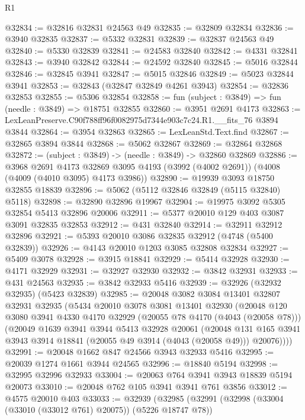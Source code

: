 \begin{lexlean}{R1}
\begin{coremodule}
@32834 := @32816 @32831 @24563 @49
@32835 := @32809 @32834
@32836 := @3940 @32835
@32837 := @5332 @32831
@32839 := @32837 @24563 @49
@32840 := @5330 @32839
@32841 := @24583 @32840
@32842 := @4331 @32841
@32843 := @3940 @32842
@32844 := @24592 @32840
@32845 := @5016 @32844
@32846 := @32845 @3941
@32847 := @5015 @32846
@32849 := @5023 @32844 @3941
@32853 := @32843 (@32847 @32849 @4261 @3943)
@32854 := @32836 @32853
@32855 := @5306 @32854
@32858 := fun (subject : @3849) => fun (needle : @3849) => @18751 @32855
@32860 := @3951 @2691 @4173
@32863 := LexLeanPreserve.C90f788ff96f0082975d7344e903c7c24.R1.__fits_76 @3894 @3844
@32864 := @3954 @32863
@32865 := LexLeanStd.Text.find
@32867 := @32865 @3894 @3844
@32868 := @5062 @32867
@32869 := @32864 @32868
@32872 := (subject : @3849) -> (needle : @3849) -> @32860 @32869
@32886 := @3968
    @2691
    @4173
    @32869
    @3095
    @4193
    (@3992 (@4002 @2691))
    (@4008 (@4009 (@4010 @3095) @4173 @3986))
@32890 := @19939 @3093 @18750 @32855 @18839
@32896 := @5062 (@5112 @32846 @32849 (@5115 @32840) @5118)
@32898 := @32890 @32896 @19967
@32904 := @19975 @3092 @5305 @32854 @5413 @32896 @20006
@32911 := @5377 @20010 @129 @403 @3087 @3091 @32835 @32853
@32912 := @431 @32840
@32914 := @32911 @32912 @32896
@32921 := @5393 @20010 @3086 @32835 @32912 (@4748 (@5400 @32839))
@32926 := @4143 @20010 @1203 @3085 @32808 @32834
@32927 := @5409 @3078
@32928 := @3915 @18841
@32929 := @5414 @32928
@32930 := @4171 @32929
@32931 := @32927 @32930
@32932 := @3842 @32931
@32933 := @431 @24563
@32935 := @3842 @32933 @5416
@32939 := @32926 (@32932 @32935) (@5423 @32839)
@32985 := @20048
    @3082
    @3084
    @13401
    @32807
    @32931
    @32935
    (@5434
      @20010
      @3078
      @3081
      @13401
      @32930
      (@20048
        @120
        @3080
        @3941
        @4330
        @4170
        @32929
        (@20055 @78 @4170 (@4043 (@20058 @78)))
        (@20049
          @1639
          @3941
          @3944
          @5413
          @32928
          @20061
          (@20048
            @131
            @165
            @3941
            @3943
            @3914
            @18841
            (@20055 @49 @3914 (@4043 (@20058 @49)))
            @20076))))
@32991 := @20048 @1662 @847 @24566 @3943 @32933 @5416
@32995 := @20039 @1274 @1661 @3944 @24565
@32996 := @18840 @5194
@32998 := @32995 @32996 @32933
@33004 := @20063 @764 @3941 @3943 @18839 @5194 @20073
@33010 := @20048 @762 @105 @3941 @3941 @761 @3856
@33012 := @4575 @20010 @403
@33033 := @32939
    (@32985
      (@32991
        (@32998 (@33004 (@33010 (@33012 @761) @20075)) (@5226 @18747 @78))

\end{coremodule}
\end{lexlean}
